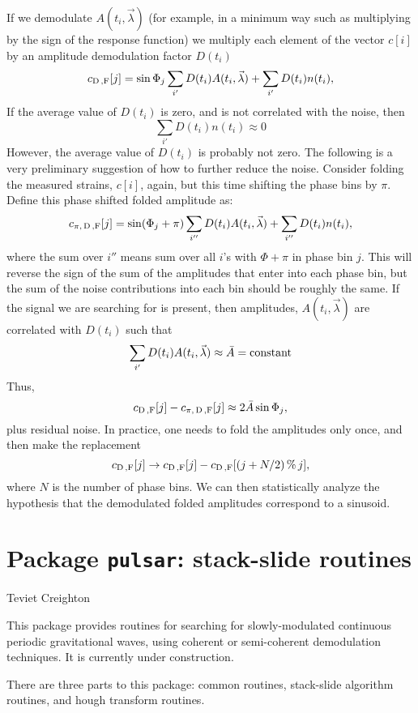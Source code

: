 If we demodulate $A(t_i,\vec{\lambda})$ (for example, in a minimum way such as multiplying by the sign
of the response function) we multiply each element of the vector $c[i]$ by an amplitude demodulation factor $D(t_i)$
$$
c_{\rm D\, , F} [j] = \sin\Phi_j \sum_{i'} D(t_i) A(t_i,\vec{\lambda}) + \sum_{i'} D(t_i) n(t_i) ,
$$
If the average value of $D(t_i)$ is zero, and is not correlated with the noise, then
$$
\sum_{i'} D(t_i) n(t_i) \approx 0
$$
However, the average value of $D(t_i)$ is probably not zero.
The following is a very preliminary suggestion of how to further reduce the noise.
Consider folding the measured strains, $c[i]$, again,
but this time shifting the phase bins by $\pi$.  Define this phase shifted folded amplitude as:
$$
c_{\pi, \, \rm D\, , F} [j] = \sin(\Phi_j + \pi) \sum_{i''} D(t_i) A(t_i,\vec{\lambda}) + \sum_{i''} D(t_i) n(t_i) ,
$$
where the sum over $i''$ means sum over all $i$'s with $\Phi + \pi$ in phase bin $j$.
This will reverse the sign of the sum of the amplitudes that enter into each phase bin, but
the sum of the noise contributions into each bin should be roughly the same.
If the signal we are searching for is present, then amplitudes, $A(t_i,\vec{\lambda})$ are correlated with $D(t_i)$ such that
$$
\sum_{i'} D(t_i) A(t_i,\vec{\lambda}) \approx \bar{A} = {\rm constant}
$$
Thus,
$$
c_{\rm D\, , F} [j] - c_{\pi, \, \rm D\, , F} [j] \approx 2 \bar{A}\sin\Phi_j ,
$$
plus residual noise.  In practice, one needs to fold the amplitudes only once, and then make the replacement
$$
c_{\rm D\, , F} [j] \rightarrow c_{\rm D\, , F} [j] - c_{\rm D\, , F} [(j + N/2) \, \% \, j] ,
$$
where $N$ is the number of phase bins.  We can then statistically analyze the hypothesis that
the demodulated folded amplitudes correspond to a sinusoid.

\newpage


\chapter{Package \texttt{pulsar}: stack-slide routines}
Teviet Creighton
\bigskip

This package provides routines for searching for slowly-modulated
continuous periodic gravitational waves, using coherent or
semi-coherent demodulation techniques.  It is currently under
construction.

There are three parts to this package: common routines, stack-slide algorithm
routines, and hough transform routines.

\newpage
\newpage
\newpage
\newpage
\newpage

